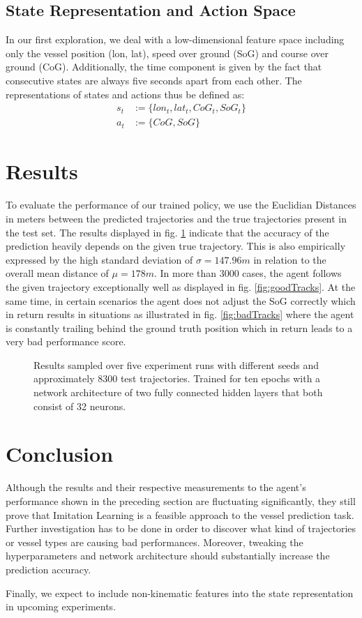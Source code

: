 \documentclass[conference]{IEEEtran}
\begin{document}
\subsection{State Representation and Action Space}
In our first exploration, we deal with a low-dimensional feature space including only the vessel position (lon, lat), speed over ground (SoG) and course over ground (CoG). Additionally, the time component is given by the fact that consecutive states are always five seconds apart from each other. The representations of states and actions thus be defined as:
\begin{equation}
    \begin{aligned}
        s_t &:= \{lon_t, lat_t, CoG_t, SoG_t\} \\
        a_t &:= \{CoG, SoG\}
    \end{aligned}
\end{equation}

\section{Results}
To evaluate the performance of our trained policy, we use the Euclidian Distances in meters between the predicted trajectories and the true trajectories present in the test set. The results displayed in fig. \ref{fig:result} indicate that the accuracy of the prediction heavily depends on the given true trajectory. This is also empirically expressed by the high standard deviation of $\sigma=147.96m$ in relation to the overall mean distance of $\mu=178m$. In more than 3000 cases, the agent follows the given trajectory exceptionally well as displayed in fig. \ref{fig:goodTracks}. At the same time, in certain scenarios the agent does not adjust the SoG correctly which in return results in situations as illustrated in fig. \ref{fig:badTracks} where the agent is constantly trailing behind the ground truth position which in return leads to a very bad performance score. 
\begin{figure}[t]
\centering

\caption{Results sampled over five experiment runs with different seeds and approximately 8300 test trajectories. Trained for ten epochs with a network architecture of two fully connected hidden layers that both consist of 32 neurons.}
\label{fig:result}
\end{figure}
\section{Conclusion}
Although the results and their respective measurements to the agent's performance shown in the preceding section are fluctuating significantly, they still prove that Imitation Learning is a feasible approach to the vessel prediction task. Further investigation has to be done in order to discover what kind of trajectories or vessel types are causing bad performances. Moreover, tweaking the hyperparameters and network architecture should substantially increase the prediction accuracy.
\par
Finally, we expect to include non-kinematic features into the state representation in upcoming experiments.



\end{document}
